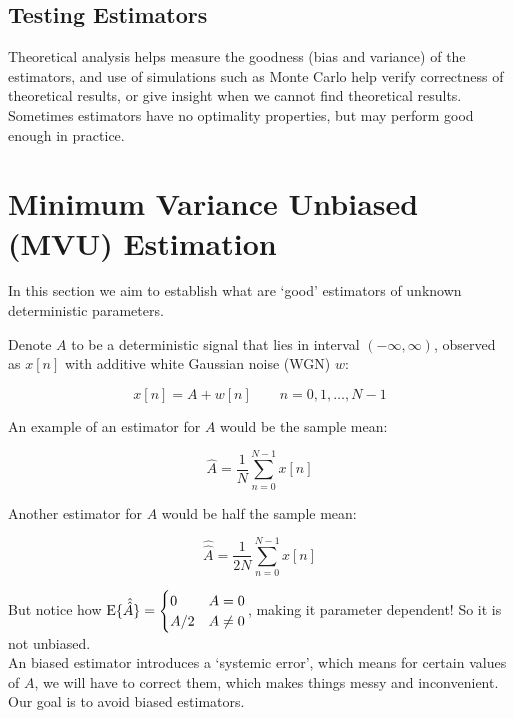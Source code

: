 \subsection{Testing Estimators}
Theoretical analysis helps measure the goodness (bias and variance) of the estimators, and use of simulations such as Monte Carlo help verify correctness of theoretical results, or give insight when we cannot find theoretical results. \\

Sometimes estimators have no optimality properties, but may perform good enough in practice.

\section{Minimum Variance Unbiased (MVU) Estimation}

In this section we aim to establish what are `good' estimators of unknown deterministic parameters.

Denote $A$ to be a deterministic signal that lies in interval $(-\infty, \infty)$, observed as $x[n]$ with additive white Gaussian noise (WGN) $w$:

\begin{equation}
    x[n] = A + w[n] \quad\quad n=0,1,\ldots,N-1
\end{equation}

An example of an estimator for $A$ would be the sample mean:

\begin{equation}
    \hat{A} = \frac{1}{N} \sum^{N-1}_{n=0} x[n]
\end{equation}

Another estimator for $A$ would be half the sample mean:

\begin{equation}
    \hat{\hat{A}} = \frac{1}{2N} \sum^{N-1}_{n=0} x[n]
\end{equation}

But notice how $\text{E}\{\hat{\hat{A}}\} = \begin{cases} 0 & A=0 \\ A/2 & A\neq 0\end{cases}$, making it parameter dependent! So it is not unbiased.\\

An biased estimator introduces a `systemic error', which means for certain values of $A$, we will have to correct them, which makes things messy and inconvenient. Our goal is to avoid biased estimators.

